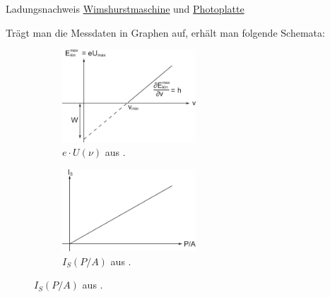 \documentclass{article}
\begin{document}
\begin{Experiment}{Ladungsnachweis \href{https://de.wikipedia.org/wiki/Wimshurstmaschine}{Wimshurstmaschine} und \href{https://de.wikipedia.org/wiki/Fotoplatte}{Photoplatte}}
\begin{itemize}
        \end{itemize}
        Trägt man die Messdaten in Graphen auf, erhält man folgende Schemata:
        \begin{figure}[H]
            \centering
            \begin{subfigure}[b]{0.4\textwidth}
                \centering
                \includegraphics[width=5cm]{Bilddateien/UvonNu-Photoeffekt.png}
                \caption{$e\cdot U(\nu)$ aus \cite{ethz:Photoeffekt}.}
            \end{subfigure}
            \hspace{1cm}
            \begin{subfigure}[b]{0.4\textwidth}
                \centering
                \includegraphics[width=5cm]{Bilddateien/Saettigungsstrom-Photoeffekt.png}
                \caption[short]{$I_S(P/A)$ aus \cite{ethz:Photoeffekt}.}
            \end{subfigure}
        \end{figure}
    \end{Experiment}
\end{document}
